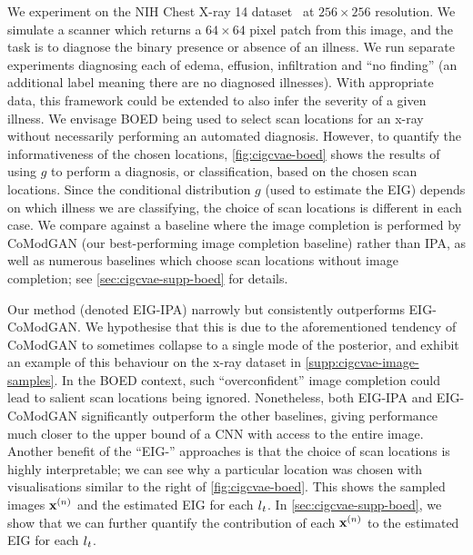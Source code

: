 We experiment on the NIH Chest X-ray 14 dataset~\citep{wang2017chestx} at
$256\times256$ resolution.
%
%
%
We simulate a scanner which returns a $64 \times 64$ pixel patch from this
image, and the task is to diagnose the binary presence or absence of an illness.
We run separate experiments diagnosing each of edema, effusion, infiltration and
``no finding'' (an additional label meaning there are no diagnosed illnesses).
With appropriate data, this framework could be extended to also infer the
severity of a given illness.
%
We envisage BOED being used to select scan locations for an x-ray without
necessarily performing an automated diagnosis. However, to quantify the
informativeness of the chosen locations, \cref{fig:cigcvae-boed} shows the results of
using $g$ to perform a diagnosis, or classification, based on the chosen scan
locations.
%
Since the conditional distribution $g$ (used to estimate the EIG) depends on
which illness we are classifying, the choice of scan locations is different in
each case.
%
We compare against a baseline where the image completion is performed by
CoModGAN (our best-performing image completion baseline) rather than IPA, as
well as numerous baselines which choose scan locations without image
completion; see \cref{sec:cigcvae-supp-boed} for details.

Our method (denoted EIG-IPA) narrowly but consistently outperforms EIG-CoModGAN.
%
%
We hypothesise that this is due to the aforementioned tendency of CoModGAN to
sometimes collapse to a single mode of the posterior, and exhibit an example of
this behaviour on the x-ray dataset in \cref{supp:cigcvae-image-samples}. In the BOED
context, such ``overconfident'' image completion could lead to salient scan
locations being ignored. Nonetheless, both EIG-IPA and EIG-CoModGAN
significantly outperform the other baselines, giving performance much closer to
the upper bound of a CNN with access to the entire image. Another benefit of the
``EIG-'' approaches is that the choice of scan locations is highly
interpretable; we can see why a particular location was chosen with
visualisations similar to the right of \cref{fig:cigcvae-boed}. This shows the sampled
images ${\mathbf{x}}^{(n)}$ and the estimated EIG for each $l{}_t$. In \cref{sec:cigcvae-supp-boed}, we
show that we can further quantify the contribution of each ${\mathbf{x}}^{(n)}$ to the
estimated EIG for each $l{}_t$.

